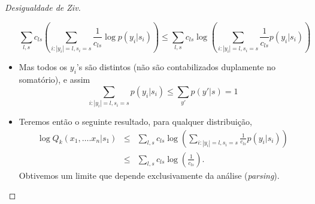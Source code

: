 \begin{frame}[allowframebreaks]
\begin{proof}[Desigualdade de Ziv]
\begin{itemize}
\begin{equation}
	\sum_{l,s} c_{ls} \left( \sum_{i: |y_i| = l, s_i = s} \frac{1}{c_{ls}} \log p(y_i | s_i) \right) \leq
		\sum_{l,s} c_{ls} \log \left( \sum_{i: |y_i| = l, s_i = s} \frac{1}{c_{ls}} p(y_i | s_i) \right) 
	\end{equation}
  \item Mas todos os $y_i$'s são distintos (não são contabilizados duplamente no somatório), e assim
	\begin{equation}
	\sum_{i: |y_i| = l, s_i = s} p(y_i | s_i) \leq \sum_{y'} p(y'|s) = 1
	\end{equation}
  \end{itemize}
  \proofbreak
  \begin{itemize}
  \item Teremos então o seguinte resultado, para qualquer distribuição,
	\begin{eqnarray}
	\log Q_k (x_1, \ldots. x_n | s_1) &\leq& \sum_{l,s} c_{ls} \log \left( \sum_{i: |y_i| = l, s_i = s} \frac{1}{c_{ls}} p(y_i | s_i) \right) \nonumber \\
		&\leq& \sum_{l,s} c_{ls} \log \left( \frac{1}{c_{ls}} \right) .
	\end{eqnarray}
	Obtivemos um limite que depende exclusivamente da análise (\textit{parsing}).
  \end{itemize}

  \end{proof}
\end{frame}


